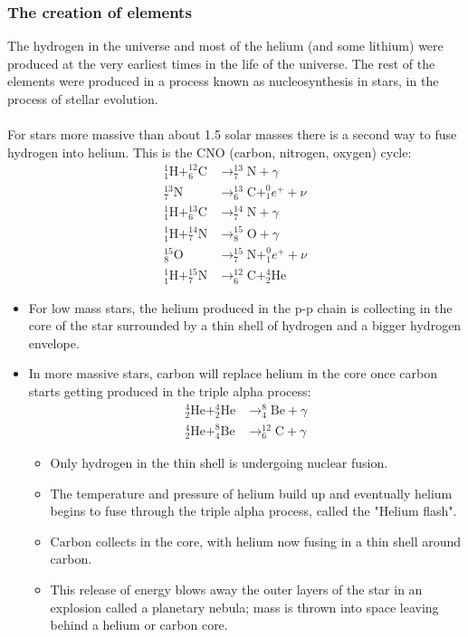 \subsubsection*{The creation of elements}
The hydrogen in the universe and most of the helium (and some lithium) were produced at the very earliest times in the life of the universe. The rest of the elements were produced in a process known as nucleosynthesis in stars, in the process of stellar evolution.\\\\
For stars more massive than about 1.5 solar masses there is a second way to fuse hydrogen into helium. This is the CNO (carbon, nitrogen, oxygen) cycle:
\[\begin{aligned}
^1_1\text{H}+^{12}_6\text{C}&\rightarrow ^{13}_7\text{N}+\gamma\\
^{13}_7\text{N}&\rightarrow ^{13}_6\text{C}+^0_1e^++\nu\\
^1_1\text{H}+^{13}_6\text{C}&\rightarrow ^{14}_7\text{N}+\gamma\\
^1_1\text{H}+^{14}_7\text{N}&\rightarrow ^{15}_8\text{O}+\gamma\\
^{15}_8\text{O}&\rightarrow ^{15}_7\text{N}+^0_1e^++\nu\\
^1_1\text{H}+^{15}_7\text{N}&\rightarrow ^{12}_6\text{C}+^4_2\text{He}
\end{aligned}\]
\begin{itemize}
  \item For low mass stars, the helium produced in the p-p chain is collecting in the core of the star surrounded by a thin shell of hydrogen and a bigger hydrogen envelope.
  \item In more massive stars, carbon will replace helium in the core once carbon starts getting produced in the triple alpha process:
  \[
  \begin{aligned}
  ^4_2\text{He}+^4_2\text{He}&\rightarrow ^8_4\text{Be} + \gamma \\
  ^4_2\text{He}+^8_4\text{Be}&\rightarrow ^{12}_6\text{C} + \gamma
  \end{aligned}
  \]
  \begin{itemize}
    \item Only hydrogen in the thin shell is undergoing nuclear fusion. 
    \item The temperature and pressure of helium build up and eventually helium begins to fuse through the triple alpha process, called the "Helium flash".
    \item Carbon collects in the core, with helium now fusing in a thin shell around carbon.
    \item This release of energy blows away the outer layers of the star in an explosion called a planetary nebula; mass is thrown into space leaving behind a helium or carbon core.
  \end{itemize}
\end{itemize}
